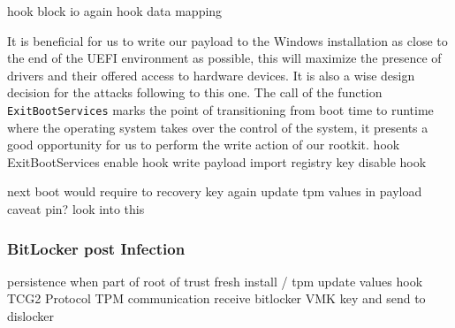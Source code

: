 hook block io
again hook data mapping

It is beneficial for us to write our payload to the Windows installation as close to the end of the \ac{UEFI} environment as possible, this will maximize the presence of drivers and their offered access to hardware devices. It is also a wise design decision for the attacks following to this one. The call of the function \lstinline{ExitBootServices} marks the point of transitioning from boot time to runtime where the operating system takes over the control of the system, it presents a good opportunity for us to perform the write action of our rootkit.
\cite{exitbootservices-hooking}
hook ExitBootServices
enable hook
write payload
import registry key
disable hook

next boot would require to recovery key again
update tpm values in payload
\cite{microsoft-bitlocker-manage-bde}
caveat pin? look into this


\subsubsection{BitLocker post Infection}
persistence when part of root of trust
fresh install / tpm update values
hook \ac{TCG2} Protocol \cite[6.7.3]{tcg-efi-protocol-spec}
\ac{TPM} communication
receive bitlocker \ac{VMK} key and send to dislocker
\cite{bde-format-spec}
\cite{tpm-sniffing}

